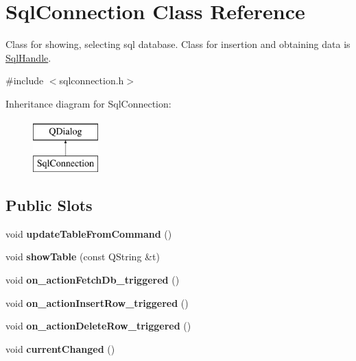 \hypertarget{classSqlConnection}{\section{Sql\+Connection Class Reference}
\label{classSqlConnection}
}


Class for showing, selecting sql database. Class for insertion and obtaining data is \hyperlink{classSqlHandle}{Sql\+Handle}.  




{\ttfamily \#include $<$sqlconnection.\+h$>$}

Inheritance diagram for Sql\+Connection\+:\begin{figure}[H]
\begin{center}
\leavevmode
\includegraphics[height=2.000000cm]{classSqlConnection}
\end{center}
\end{figure}
\subsection*{Public Slots}
\begin{DoxyCompactItemize}
\item 
\hypertarget{classSqlConnection_a82e3b42ecea79904550546acbcef70b7}{void {\bfseries update\+Table\+From\+Command} ()}\label{classSqlConnection_a82e3b42ecea79904550546acbcef70b7}

\item 
\hypertarget{classSqlConnection_ade9e50f4c19e51e1229c2c71f0ae7be4}{void {\bfseries show\+Table} (const Q\+String \&t)}\label{classSqlConnection_ade9e50f4c19e51e1229c2c71f0ae7be4}

\item 
\hypertarget{classSqlConnection_a42fec1968d2a28aed8a130a3851715ee}{void {\bfseries on\+\_\+action\+Fetch\+Db\+\_\+triggered} ()}\label{classSqlConnection_a42fec1968d2a28aed8a130a3851715ee}

\item 
\hypertarget{classSqlConnection_a585556486aefb0e01764c299678a7998}{void {\bfseries on\+\_\+action\+Insert\+Row\+\_\+triggered} ()}\label{classSqlConnection_a585556486aefb0e01764c299678a7998}

\item 
\hypertarget{classSqlConnection_a54e2f239aa237f1eed5e4c6023c2001a}{void {\bfseries on\+\_\+action\+Delete\+Row\+\_\+triggered} ()}\label{classSqlConnection_a54e2f239aa237f1eed5e4c6023c2001a}

\item 
\hypertarget{classSqlConnection_ac11db1288aa22bee6a645f006665558e}{void {\bfseries current\+Changed} ()}\label{classSqlConnection_ac11db1288aa22bee6a645f006665558e}

\end{DoxyCompactItemize}
